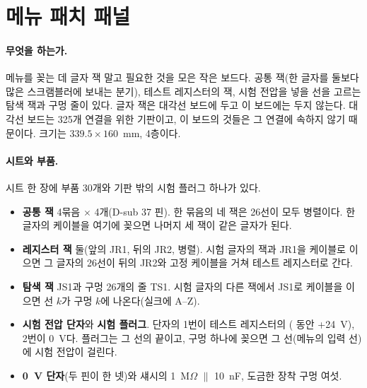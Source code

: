 
\section{메뉴 패치 패널}\label{sch:patch-panel}

\paragraph{무엇을 하는가.} 메뉴를 꽂는 데 글자 잭 말고 필요한 것을 모은 작은 보드다. 공통 잭(한 글자를 둘보다 많은
스크램블러에 보내는 분기), 테스트 레지스터의 잭, 시험 전압을 넣을 선을 고르는 탐색 잭과 구멍 줄이 있다. 글자 잭은
대각선 보드에 두고 이 보드에는 두지 않는다. 대각선 보드는 325개 연결을 위한 기판이고, 이 보드의 것들은 그 연결에
속하지 않기 때문이다. 크기는 $339.5 \times 160$~mm, 4층이다.

\paragraph{시트와 부품.} 시트 한 장에 부품 30개와 기판 밖의 시험 플러그 하나가 있다.

\begin{itemize}
\item \textbf{공통 잭} 4묶음 $\times$ 4개(D-sub 37 핀). 한 묶음의 네 잭은 26선이 모두 병렬이다. 한 글자의 케이블을
여기에 꽂으면 나머지 세 잭이 같은 글자가 된다.
\item \textbf{레지스터 잭} 둘(앞의 JR1, 뒤의 JR2, 병렬). 시험 글자의 잭과 JR1을 케이블로 이으면 그 글자의 26선이
뒤의 JR2와 고정 케이블을 거쳐 테스트 레지스터로 간다.
\item \textbf{탐색 잭} JS1과 구멍 26개의 줄 TS1. 시험 글자의 다른 잭에서 JS1로 케이블을 이으면 선 $k$가 구멍 $k$에
나온다(실크에 A--Z).
\item \textbf{시험 전압 단자}와 \textbf{시험 플러그}. 단자의 1번이 테스트 레지스터의 ( 동안
+24~V), 2번이 0~V다. 플러그는 그 선의 끝이고, 구멍 하나에 꽂으면 그 선(메뉴의 입력 선)에 시험 전압이 걸린다.
\item \textbf{0~V 단자}(두 핀이 한 넷)와 섀시의 1~M$\Omega$ $\parallel$ 10~nF, 도금한 장착 구멍 여섯.
\end{itemize}

